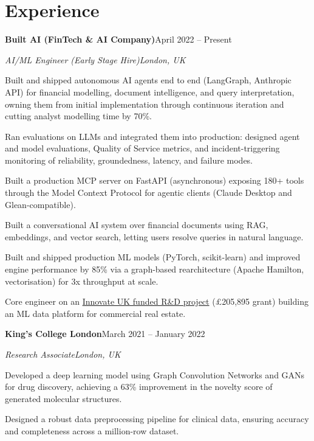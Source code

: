 \documentclass[10pt,a4paper]{article}
\newcommand{\entry}[4]{%
  {\color{company}\bfseries #1}\hfill {\color{muted}#2}\par
  \vspace{1pt}
  {\itshape #3}\hfill {\color{muted}\itshape #4}\par
  \vspace{3pt}%
}
\begin{document}
\section{Experience}
\entry{Built AI (FinTech \& AI Company)}{April 2022 -- Present}{AI/ML Engineer (Early Stage Hire)}{London, UK}
\begin{tight}
  \item Built and shipped autonomous AI agents end to end (LangGraph, Anthropic API) for financial modelling, document intelligence, and query interpretation, owning them from initial implementation through continuous iteration and cutting analyst modelling time by 70\%.
  \item Ran evaluations on LLMs and integrated them into production: designed agent and model evaluations, Quality of Service metrics, and incident-triggering monitoring of reliability, groundedness, latency, and failure modes.
  \item Built a production MCP server on FastAPI (asynchronous) exposing 180+ tools through the Model Context Protocol for agentic clients (Claude Desktop and Glean-compatible).
  \item Built a conversational AI system over financial documents using RAG, embeddings, and vector search, letting users resolve queries in natural language.
  \item Built and shipped production ML models (PyTorch, scikit-learn) and improved engine performance by 85\% via a graph-based rearchitecture (Apache Hamilton, vectorisation) for 3x throughput at scale.
  \item Core engineer on an \href{https://gtr.ukri.org/projects?ref=10022996}{Innovate UK funded R\&D project} (\pounds205,895 grant) building an ML data platform for commercial real estate.
\end{tight}

\entry{King's College London}{March 2021 -- January 2022}{Research Associate}{London, UK}
\begin{tight}
  \item Developed a deep learning model using Graph Convolution Networks and GANs for drug discovery, achieving a 63\% improvement in the novelty score of generated molecular structures.
  \item Designed a robust data preprocessing pipeline for clinical data, ensuring accuracy and completeness across a million-row dataset.
\end{tight}
\end{document}
